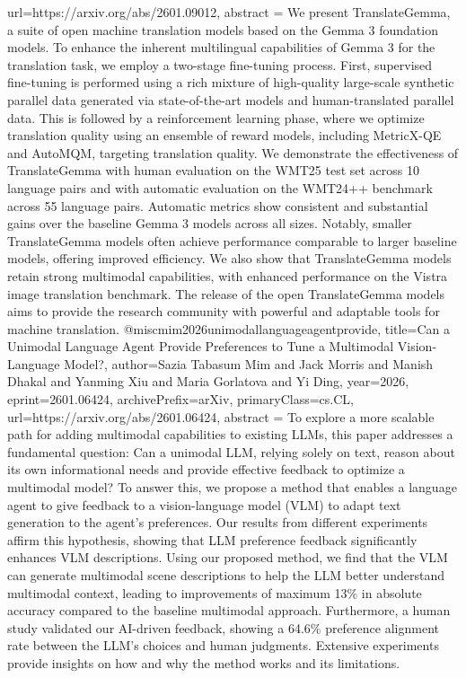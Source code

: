 {      url={https://arxiv.org/abs/2601.09012},
      abstract = {We present TranslateGemma, a suite of open machine translation models based on the Gemma 3 foundation models. To enhance the inherent multilingual capabilities of Gemma 3 for the translation task, we employ a two-stage fine-tuning process. First, supervised fine-tuning is performed using a rich mixture of high-quality large-scale synthetic parallel data generated via state-of-the-art models and human-translated parallel data. This is followed by a reinforcement learning phase, where we optimize translation quality using an ensemble of reward models, including MetricX-QE and AutoMQM, targeting translation quality. We demonstrate the effectiveness of TranslateGemma with human evaluation on the WMT25 test set across 10 language pairs and with automatic evaluation on the WMT24++ benchmark across 55 language pairs. Automatic metrics show consistent and substantial gains over the baseline Gemma 3 models across all sizes. Notably, smaller TranslateGemma models often achieve performance comparable to larger baseline models, offering improved efficiency. We also show that TranslateGemma models retain strong multimodal capabilities, with enhanced performance on the Vistra image translation benchmark. The release of the open TranslateGemma models aims to provide the research community with powerful and adaptable tools for machine translation.}
}@misc{mim2026unimodallanguageagentprovide,
      title={Can a Unimodal Language Agent Provide Preferences to Tune a Multimodal Vision-Language Model?}, 
      author={Sazia Tabasum Mim and Jack Morris and Manish Dhakal and Yanming Xiu and Maria Gorlatova and Yi Ding},
      year={2026},
      eprint={2601.06424},
      archivePrefix={arXiv},
      primaryClass={cs.CL},
      url={https://arxiv.org/abs/2601.06424},
      abstract = {To explore a more scalable path for adding multimodal capabilities to existing LLMs, this paper addresses a fundamental question: Can a unimodal LLM, relying solely on text, reason about its own informational needs and provide effective feedback to optimize a multimodal model? To answer this, we propose a method that enables a language agent to give feedback to a vision-language model (VLM) to adapt text generation to the agent's preferences. Our results from different experiments affirm this hypothesis, showing that LLM preference feedback significantly enhances VLM descriptions. Using our proposed method, we find that the VLM can generate multimodal scene descriptions to help the LLM better understand multimodal context, leading to improvements of maximum 13\% in absolute accuracy compared to the baseline multimodal approach. Furthermore, a human study validated our AI-driven feedback, showing a 64.6\% preference alignment rate between the LLM's choices and human judgments. Extensive experiments provide insights on how and why the method works and its limitations.}
}
